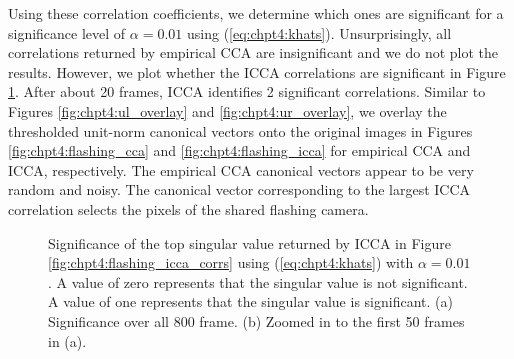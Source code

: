 Using these correlation coefficients, we determine which ones are significant for a
significance level of $\alpha=0.01$ using (\ref{eq:chpt4:khats}). Unsurprisingly, all
correlations returned by empirical CCA are insignificant and we do not plot the
results. However, we plot whether the ICCA correlations are significant in Figure
\ref{fig:chpt4:flashing_sigs}. After about 20 frames, ICCA identifies 2 significant
correlations. Similar to Figures \ref{fig:chpt4:ul_overlay} and
\ref{fig:chpt4:ur_overlay}, we overlay the thresholded unit-norm canonical vectors onto
the original images in Figures \ref{fig:chpt4:flashing_cca} and
\ref{fig:chpt4:flashing_icca} for empirical CCA and ICCA, respectively. The empirical CCA
canonical vectors appear to be very random and noisy. The canonical vector corresponding
to the largest ICCA correlation selects the pixels of the shared flashing camera.

\begin{figure}
  \begin{center}
    \caption{Significance of the top singular value returned by ICCA in Figure
      \ref{fig:chpt4:flashing_icca_corrs} using (\ref{eq:chpt4:khats}) with $\alpha=0.01$. A
      value of zero represents that the singular value is not significant. A value of one
      represents that the singular value is significant. (a) Significance over all 800
      frame. (b) Zoomed in to the first 50 frames in (a).}
    \label{fig:chpt4:flashing_sigs}
  \end{center}
\end{figure}

